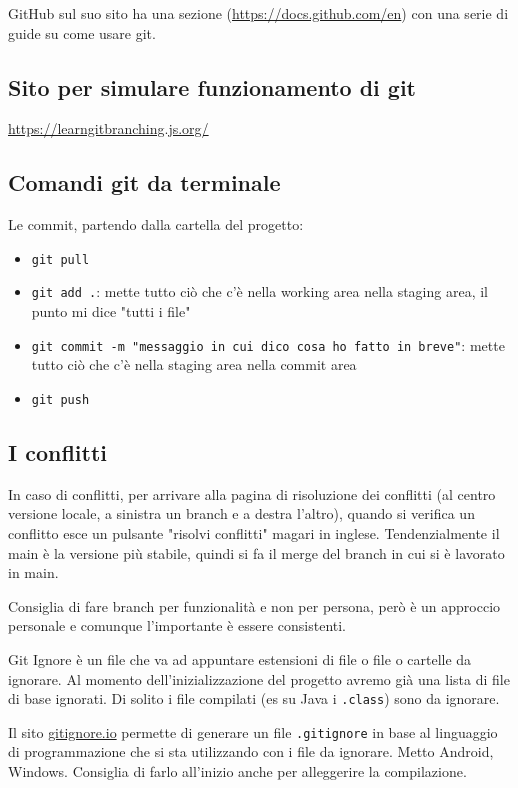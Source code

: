 \par GitHub sul suo sito ha una sezione (\url{https://docs.github.com/en}) con una serie di guide su come usare git.

\subsection{Sito per simulare funzionamento di git}
\url{https://learngitbranching.js.org/}

\subsection{Comandi git da terminale}
\par Le commit, partendo dalla cartella del progetto:
\begin{itemize}
    \item \texttt{git pull}
    \item \texttt{git add .}: mette tutto ciò che c'è nella working area nella staging area, il punto mi dice "tutti i file"
    \item \texttt{git commit -m "messaggio in cui dico cosa ho fatto in breve"}: mette tutto ciò che c'è nella staging area nella commit area
    \item \texttt{git push}
\end{itemize}

\subsection{I conflitti}
\par In caso di conflitti, per arrivare alla pagina di risoluzione dei conflitti (al centro versione locale, a sinistra un branch e a destra l'altro), quando si verifica un conflitto esce un pulsante "risolvi conflitti" magari in inglese. Tendenzialmente il main è la versione più stabile, quindi si fa il merge del branch in cui si è lavorato in main.
\par Consiglia di fare branch per funzionalità e non per persona, però è un approccio personale e comunque l'importante è essere consistenti.


\par Git Ignore è un file che va ad appuntare estensioni di file o file o cartelle da ignorare. Al momento dell'inizializzazione del progetto avremo già una lista di file di base ignorati. Di solito i file compilati (es su Java i \texttt{.class}) sono da ignorare.
\par Il sito \url{gitignore.io} permette di generare un file \texttt{.gitignore} in base al linguaggio di programmazione che si sta utilizzando con i file da ignorare. Metto Android, Windows. Consiglia di farlo all'inizio anche per alleggerire la compilazione.

